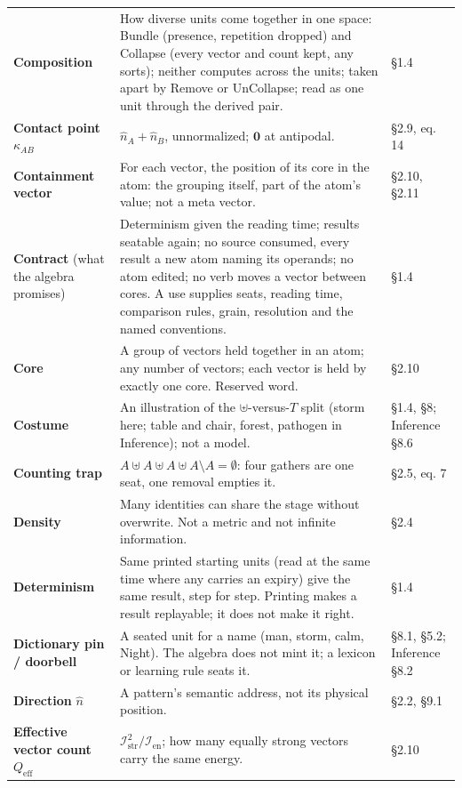 \documentclass[10.5pt]{article}
\begin{document}
{\begin{longtable}{L{3.6cm}L{10.9cm}L{1.8cm}}
\textbf{Composition} & How diverse units come together in one space: Bundle (presence, repetition dropped) and Collapse (every vector and count kept, any sorts); neither computes across the units; taken apart by Remove or UnCollapse; read as one unit through the derived pair. & §1.4 \\
\textbf{Contact point} $\kappa_{AB}$ & $\hat n_A+\hat n_B$, unnormalized; $\mathbf0$ at antipodal. & §2.9, eq. 14 \\
\textbf{Containment vector} & For each vector, the position of its core in the atom: the grouping itself, part of the atom's value; not a meta vector. & §2.10, §2.11 \\
\textbf{Contract} (what the algebra promises) & Determinism given the reading time; results seatable again; no source consumed, every result a new atom naming its operands; no atom edited; no verb moves a vector between cores. A use supplies seats, reading time, comparison rules, grain, resolution and the named conventions. & §1.4 \\
\textbf{Core} & A group of vectors held together in an atom; any number of vectors; each vector is held by exactly one core. Reserved word. & §2.10 \\
\textbf{Costume} & An illustration of the $\uplus$-versus-$T$ split (storm here; table and chair, forest, pathogen in Inference); not a model. & §1.4, §8; Inference §8.6 \\
\textbf{Counting trap} & $A\uplus A\uplus A\uplus A\setminus A=\emptyset$: four gathers are one seat, one removal empties it. & §2.5, eq. 7 \\
\textbf{Density} & Many identities can share the stage without overwrite. Not a metric and not infinite information. & §2.4 \\
\textbf{Determinism} & Same printed starting units (read at the same time where any carries an expiry) give the same result, step for step. Printing makes a result replayable; it does not make it right. & §1.4 \\
\textbf{Dictionary pin / doorbell} & A seated unit for a name (man, storm, calm, Night). The algebra does not mint it; a lexicon or learning rule seats it. & §8.1, §5.2; Inference §8.2 \\
\textbf{Direction} $\hat n$ & A pattern's semantic address, not its physical position. & §2.2, §9.1 \\
\textbf{Effective vector count} $Q_{\text{eff}}$ & $\mathcal{I}_{\mathrm{str}}^2/\mathcal{I}_{\mathrm{en}}$; how many equally strong vectors carry the same energy. & §2.10 \\

\end{longtable}}
\end{document}
